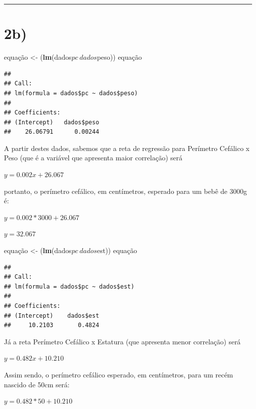 \documentclass[11pt,]{article}
\newenvironment{Shaded}{\begin{snugshade}}{\end{snugshade}}
\newcommand{\KeywordTok}[1]{\textcolor[rgb]{0.13,0.29,0.53}{\textbf{{#1}}}}
\newcommand{\StringTok}[1]{\textcolor[rgb]{0.31,0.60,0.02}{{#1}}}
\newcommand{\NormalTok}[1]{{#1}}
\begin{document}
\begin{center}\rule{0.5\linewidth}{\linethickness}\end{center}

\section{2b)}\label{b-1}

\begin{Shaded}
\begin{Highlighting}[]
\NormalTok{equação <-}\StringTok{ }\NormalTok{(}\KeywordTok{lm}\NormalTok{(dados$pc~dados$peso))}
\NormalTok{equação}
\end{Highlighting}
\end{Shaded}

\begin{verbatim}
## 
## Call:
## lm(formula = dados$pc ~ dados$peso)
## 
## Coefficients:
## (Intercept)   dados$peso  
##    26.06791      0.00244
\end{verbatim}

A partir destes dados, sabemos que a reta de regressão para Perímetro
Cefálico x Peso (que é a variável que apresenta maior correlação) será

\(y = 0.002x + 26.067\)

portanto, o perímetro cefálico, em centímetros, esperado para um bebê de
3000g é:

\(y= 0.002*3000 + 26.067\)

\(y= 32.067\)

\begin{Shaded}
\begin{Highlighting}[]
\NormalTok{equação <-}\StringTok{ }\NormalTok{(}\KeywordTok{lm}\NormalTok{(dados$pc~dados$est))}
\NormalTok{equação}
\end{Highlighting}
\end{Shaded}

\begin{verbatim}
## 
## Call:
## lm(formula = dados$pc ~ dados$est)
## 
## Coefficients:
## (Intercept)    dados$est  
##     10.2103       0.4824
\end{verbatim}

Já a reta Perímetro Cefálico x Estatura (que apresenta menor correlação)
será

\(y=0.482x + 10.210\)

Assim sendo, o perímetro cefálico esperado, em centímetros, para um
recém nascido de 50cm será:

\(y= 0.482 * 50 + 10.210\)
\end{document}
